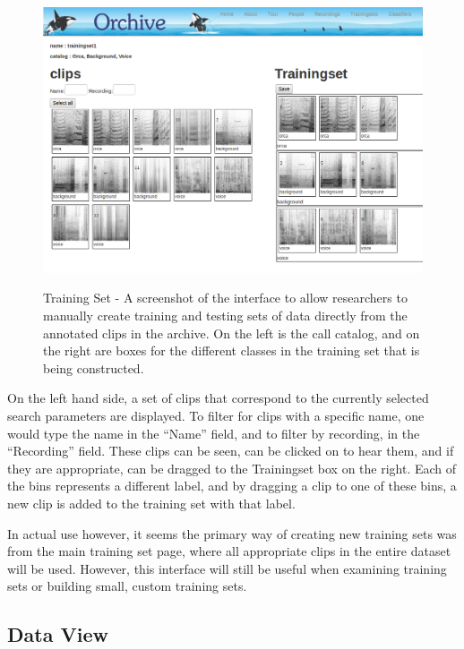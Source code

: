 \documentclass[12pt,oneside]{book}
\begin{document}
\begin{figure}[t]
\centering
\includegraphics[width=\columnwidth]{figures/orchiveV2trainingset}
\label{fig:orchiveV2trainingset}
\caption{Training Set - A screenshot of the interface to allow
  researchers to manually create training and testing sets of data
  directly from the annotated clips in the archive.  On the left is
  the call catalog, and on the right are boxes for the different
  classes in the training set that is being constructed.}
\end{figure}



On the left hand side, a set of clips that correspond to the currently
selected search parameters are displayed.  To filter for clips with a
specific name, one would type the name in the ``Name'' field, and to
filter by recording, in the ``Recording'' field.  These clips can be
seen, can be clicked on to hear them, and if they are appropriate, can be
dragged to the Trainingset box on the right.  Each of the bins
represents a different label, and by dragging a clip to one of these
bins, a new clip is added to the training set with that label.

In actual use however, it seems the primary way of creating new
training sets was from the main training set page, where all
appropriate clips in the entire dataset will be used.  However, this
interface will still be useful when examining training sets or
building small, custom training sets.


\subsection{Data View}
\end{document}
